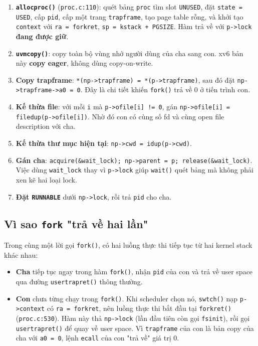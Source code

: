 \begin{enumerate}[itemsep=0pt, topsep=2.5pt, leftmargin=1.5cm]
    \item \textbf{\texttt{allocproc()}} (\texttt{proc.c:110}): quét bảng \texttt{proc} tìm slot \texttt{UNUSED}, đặt \texttt{state = USED}, cấp \texttt{pid}, cấp một trang \texttt{trapframe}, tạo page table rỗng, và khởi tạo \texttt{context} với \texttt{ra = forkret}, \texttt{sp = kstack + PGSIZE}. Hàm trả về với \texttt{p->lock} \textbf{đang được giữ}.
    \item \textbf{\texttt{uvmcopy()}}: copy toàn bộ vùng nhớ người dùng của cha sang con. xv6 bản này \textbf{copy eager}, không dùng copy-on-write.
    \item \textbf{Copy trapframe}: \texttt{*(np->trapframe) = *(p->trapframe)}, sau đó đặt \texttt{np->trapframe->a0 = 0}. Đây là chi tiết khiến \texttt{fork()} trả về 0 ở tiến trình con.
    \item \textbf{Kế thừa file}: với mỗi \texttt{i} mà \texttt{p->ofile[i] != 0}, gán \texttt{np->ofile[i] = filedup(p->ofile[i])}. Nhờ đó con có cùng số fd và cùng open file description với cha.
    \item \textbf{Kế thừa thư mục hiện tại}: \texttt{np->cwd = idup(p->cwd)}.
    \item \textbf{Gán cha}: \texttt{acquire(\&wait\_lock); np->parent = p; release(\&wait\_lock)}. Việc dùng \texttt{wait\_lock} thay vì \texttt{p->lock} giúp \texttt{wait()} quét bảng mà không phải xen kẽ hai loại lock.
    \item \textbf{Đặt \texttt{RUNNABLE}} dưới \texttt{np->lock}, rồi trả \texttt{pid} cho cha.
\end{enumerate}

\subsection{Vì sao \texttt{fork} "trả về hai lần"}

Trong cùng một lời gọi \texttt{fork()}, có hai luồng thực thi tiếp tục từ hai kernel stack khác nhau:

\begin{itemize}[itemsep=0pt, topsep=2.5pt, leftmargin=1.5cm]
    \item \textbf{Cha} tiếp tục ngay trong hàm \texttt{fork()}, nhận \texttt{pid} của con và trả về user space qua đường \texttt{usertrapret()} thông thường.
    \item \textbf{Con} chưa từng chạy trong \texttt{fork()}. Khi scheduler chọn nó, \texttt{swtch()} nạp \texttt{p->context} có \texttt{ra = forkret}, nên luồng thực thi bắt đầu tại \texttt{forkret()} (\texttt{proc.c:530}). Hàm này thả \texttt{np->lock} (lần đầu tiên còn gọi \texttt{fsinit}), rồi gọi \texttt{usertrapret()} để quay về user space. Vì \texttt{trapframe} của con là bản copy của cha với \texttt{a0 = 0}, lệnh \texttt{ecall} của con "trả về" giá trị 0.
\end{itemize}

